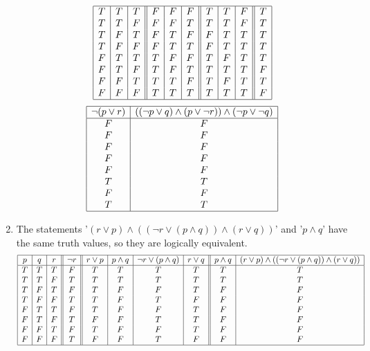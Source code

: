 \documentclass{article}
\begin{document}
\begin{enumerate}[label=\textbf{\arabic*.}]
\[\begin{array}{|c|c|c||c|c|c||c|c|c||c|c||c|}
\hline
T & T & T & F & F & F & T & T & F & T \\
T & T & F & F & F & T & T & T & F & T \\
T & F & T & F & T & F & F & T & T & T \\
T & F & F & F & T & T & F & T & T & T \\
F & T & T & T & F & F & T & F & T & T \\
F & T & F & T & F & T & T & T & T & F \\
F & F & T & T & T & F & T & F & T & T \\
F & F & F & T & T & T & T & T & T & F \\
\hline 
\end{array}
\]
\[
\begin{array}{|c|c|}
\hline
\neg (p \lor r) & ((\neg p \lor q) \land (p \lor \neg r)) \land (\neg p \lor \neg q)\\
\hline
F & F \\
F & F \\
F & F \\
F & F \\
F & F \\
T & T \\
F & F \\
T & T \\
\hline 
\end{array}
\]
\item %
The statements '$(r \lor p) \land ((\neg r \lor (p \land q )) \land (r \lor q))$' and '$p \land q$' have the same truth values, so they are logically equivalent.
\[
\begin{array}{|c|c|c||c||c|c|c|c||c|c|}
\hline
p & q & r & \neg r & r \lor p & p \land q & \neg r \lor (p \land q) & r \lor q & p \land q & (r \lor p) \land ((\neg r \lor (p \land q)) \land (r \lor q))\\
\hline
T & T & T & F & T & T & T & T & T & T \\
T & T & F & T & T & T & T & T & T & T \\
T & F & T & F & T & F & F & T & F & F \\
T & F & F & T & T & F & T & F & F & F \\
F & T & T & F & T & F & F & T & F & F \\
F & T & F & T & F & F & T & T & F & F \\
F & F & T & F & T & F & F & T & F & F \\
F & F & F & T & F & F & T & F & F & F \\
\hline 
\end{array}
\]
\end{enumerate}
\end{document}
